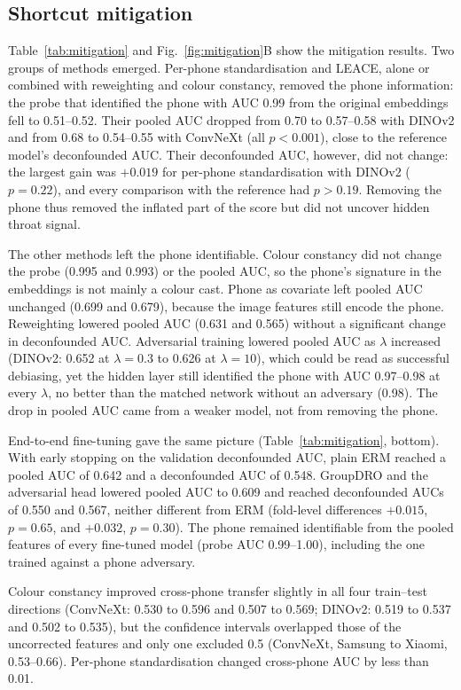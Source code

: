 \documentclass[preprint,12pt]{elsarticle}
\begin{document}
\subsection{Shortcut mitigation}

Table~\ref{tab:mitigation} and Fig.~\ref{fig:mitigation}B show the mitigation results. Two groups of methods emerged. Per-phone standardisation and LEACE, alone or combined with reweighting and colour constancy, removed the phone information: the probe that identified the phone with AUC 0.99 from the original embeddings fell to 0.51--0.52. Their pooled AUC dropped from 0.70 to 0.57--0.58 with DINOv2 and from 0.68 to 0.54--0.55 with ConvNeXt (all $p < 0.001$), close to the reference model's deconfounded AUC. Their deconfounded AUC, however, did not change: the largest gain was $+0.019$ for per-phone standardisation with DINOv2 ($p = 0.22$), and every comparison with the reference had $p > 0.19$. Removing the phone thus removed the inflated part of the score but did not uncover hidden throat signal.

The other methods left the phone identifiable. Colour constancy did not change the probe (0.995 and 0.993) or the pooled AUC, so the phone's signature in the embeddings is not mainly a colour cast. Phone as covariate left pooled AUC unchanged (0.699 and 0.679), because the image features still encode the phone. Reweighting lowered pooled AUC (0.631 and 0.565) without a significant change in deconfounded AUC. Adversarial training lowered pooled AUC as $\lambda$ increased (DINOv2: 0.652 at $\lambda = 0.3$ to 0.626 at $\lambda = 10$), which could be read as successful debiasing, yet the hidden layer still identified the phone with AUC 0.97--0.98 at every $\lambda$, no better than the matched network without an adversary (0.98). The drop in pooled AUC came from a weaker model, not from removing the phone.

End-to-end fine-tuning gave the same picture (Table~\ref{tab:mitigation}, bottom). With early stopping on the validation deconfounded AUC, plain ERM reached a pooled AUC of 0.642 and a deconfounded AUC of 0.548. GroupDRO and the adversarial head lowered pooled AUC to 0.609 and reached deconfounded AUCs of 0.550 and 0.567, neither different from ERM (fold-level differences $+0.015$, $p = 0.65$, and $+0.032$, $p = 0.30$). The phone remained identifiable from the pooled features of every fine-tuned model (probe AUC 0.99--1.00), including the one trained against a phone adversary.

Colour constancy improved cross-phone transfer slightly in all four train--test directions (ConvNeXt: 0.530 to 0.596 and 0.507 to 0.569; DINOv2: 0.519 to 0.537 and 0.502 to 0.535), but the confidence intervals overlapped those of the uncorrected features and only one excluded 0.5 (ConvNeXt, Samsung to Xiaomi, 0.53--0.66). Per-phone standardisation changed cross-phone AUC by less than 0.01.
\end{document}
